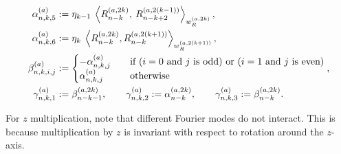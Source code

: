 \documentclass[11pt, oneside]{article}   	%
\begin{document}
\begin{lemma}
\begin{align*}
	\alphaa_{n,k,5} &:= \eta_{k-1} \: \ip<\genjacnmk^{(a, 2k)}, \: \genjac_{n-k+2}^{(a, 2(k-1))}>_{\genjacw^{(a, 2k)}}, \\
	\alphaa_{n,k,6} &:=\eta_{k} \: \ip<\genjacnmk^{(a, 2k)}, \genjacnmk^{(a, 2(k+1))}>_{\genjacw^{(a, 2(k+1))}}, \\
	\betaa_{n,k,i,j} &:= 
		\begin{cases}
			- \alphaa_{n,k,j} \quad &\text{if }(i = 0 \text{ and } j \text{ is odd}) \text{ or }(i = 1 \text{ and } j \text{ is even}) \\
			\alphaa_{n,k,j} \quad &\text{otherwise}
		\end{cases}, \\	
	\gammaa_{n,k,1} &:= \beta_{n-k-1}^{(a, 2k)}, \qquad \gammaa_{n,k,2} := \alpha_{n-k}^{(a, 2k)}, \qquad \gammaa_{n,k,3} := \beta_{n-k}^{(a, 2k)}.
\end{align*}
\end{lemma}
\begin{remark}
	For $z$ multiplication, note that different Fourier modes do not interact. This is because multiplication by $z$ is invariant with respect to rotation around the $z$-axis. 
\end{remark}
\end{document}
